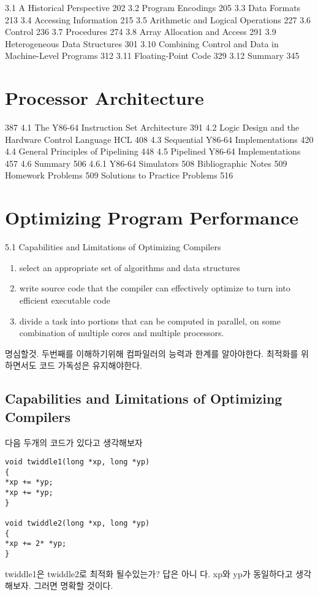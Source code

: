 3.1 A Historical Perspective 202
3.2 Program Encodings 205
3.3 Data Formats 213
3.4 Accessing Information 215
3.5 Arithmetic and Logical Operations 227
3.6 Control 236
3.7 Procedures 274
3.8 Array Allocation and Access 291
3.9 Heterogeneous Data Structures 301
3.10 Combining Control and Data in Machine-Level Programs 312
3.11 Floating-Point Code 329
3.12 Summary 345

\section{Processor Architecture}

387
4.1 The Y86-64 Instruction Set Architecture 391
4.2 Logic Design and the Hardware Control Language HCL 408
4.3 Sequential Y86-64 Implementations 420
4.4 General Principles of Pipelining 448
4.5 Pipelined Y86-64 Implementations 457
4.6 Summary 506
4.6.1 Y86-64 Simulators 508
Bibliographic Notes 509
Homework Problems 509
Solutions to Practice Problems 516

\section{Optimizing Program Performance}

5.1 Capabilities and Limitations of Optimizing Compilers

\begin{enumerate}
    \item select an appropriate set of algorithms and data structures
    \item  write source code that the compiler can effectively optimize to turn into efficient executable code
    \item  divide a task into portions that can be computed in parallel, on some combination of multiple cores and multiple processors.
\end{enumerate}
명심할것. 두번째를 이해하기위해 컴파일러의 능력과 한계를 알아야한다. 최적화를 위하면서도 코드 가독성은 유지해야한다.

\subsection{Capabilities and Limitations of Optimizing Compilers}

다음 두개의 코드가 있다고 생각해보자 
\begin{lstlisting}[style = CStyle]
void twiddle1(long *xp, long *yp)
{
*xp += *yp;
*xp += *yp;
}

void twiddle2(long *xp, long *yp)
{
*xp += 2* *yp;
}
\end{lstlisting}
twiddle1은 twiddle2로 최적화 될수있는가? 답은 아니 다. xp와 yp가 동일하다고 생각해보자. 그러면 명확할 것이다.


